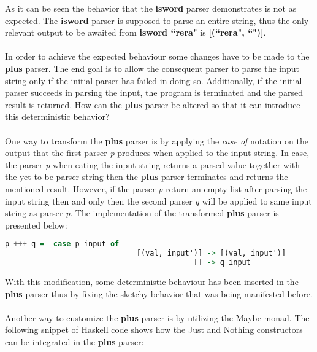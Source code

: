 \documentclass[a4paper, onecolumn]{article}
\begin{document}
    \noindent As it can be seen the behavior that the \textbf{isword} parser demonstrates is not as expected. The \textbf{isword} parser is supposed to parse an entire string, thus the only relevant output to be awaited from \textbf{isword ``rera"} is \textbf{[(``rera", ``")]}. \\ \\
      In order to achieve the expected behaviour some changes have to be made to the \textbf{plus} parser. The end goal is to allow the consequent parser to parse the input string only if the initial parser has failed in doing so. Additionally, if the initial parser succeeds in parsing the input, the program is terminated and the parsed result is returned. How can the \textbf{plus} parser be altered so that it can introduce this deterministic behavior? \\ \\ 
      One way to transform the \textbf{plus} parser is by applying the \textit{case of} notation on the output that the first parser \textit{p} produces when applied to the input string. In case, the parser \textit{p} when eating the input string returns a parsed value together with the yet to be parser string then the \textbf{plus} parser terminates and returns the mentioned result. However, if the parser \textit{p} return an empty list after parsing the input string then and only then the second parser \textit{q} will be applied to same input string as parser \textit{p}. The implementation of the transformed \textbf{plus} parser is presented below:
     
    \begin{tcolorbox}
    \begin{lstlisting}[language=Haskell] 
        p +++ q =  case p input of
                              [(val, input')] -> [(val, input')]
                                           [] -> q input
    \end{lstlisting}
    \end{tcolorbox}
     
     \noindent With this modification, some deterministic behaviour has been inserted in the \textbf{plus} parser thus by fixing the sketchy behavior that was being manifested before. \\ \\
     Another way to customize the \textbf{plus} parser is by utilizing the Maybe monad. The following snippet of Haskell code shows how the Just and Nothing constructors can be integrated in the \textbf{plus} parser:
     
\end{document}
